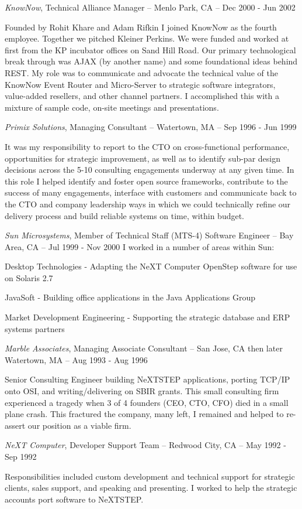 \documentclass[letterpaper]{article}
\renewenvironment{itemize}{
  \begin{list}{}{
    \setlength{\leftmargin}{1.5em}
  }
}{
  \end{list}
}
\begin{document}
\begin{itemize}
\item {\it KnowNow}, Technical Alliance Manager -- Menlo Park, CA -- Dec 2000 - Jun 2002

Founded by Rohit Khare and Adam Rifkin I joined KnowNow as the fourth
employee. Together we pitched Kleiner Perkins. We were funded and worked at
first from the KP incubator offices on Sand Hill Road. Our primary
technological break through was AJAX (by another name) and some foundational
ideas behind REST. My role was to communicate and advocate the technical value
of the KnowNow Event Router and Micro-Server to strategic software integrators,
value-added resellers, and other channel partners. I accomplished this with a
mixture of sample code, on-site meetings and presentations.

\item {\it Primix Solutions}, Managing Consultant -- Watertown, MA -- Sep 1996 - Jun 1999

It was my responsibility to report to the CTO on cross-functional performance,
opportunities for strategic improvement, as well as to identify sub-par design
decisions across the 5-10 consulting engagements underway at any given time. In
this role I helped identify and foster open source frameworks, contribute to
the success of many engagements, interface with customers and communicate back
to the CTO and company leadership ways in which we could technically refine our
delivery process and build reliable systems on time, within budget.

\item {\it Sun Microsystems}, Member of Technical Staff (MTS-4) Software Engineer -- Bay Area, CA -- Jul 1999 - Nov 2000
I worked in a number of areas within Sun:
\begin{itemize}
\item Desktop Technologies - Adapting the NeXT Computer OpenStep software for use on Solaris 2.7
\item JavaSoft - Building office applications in the Java Applications Group
\item Market Development Engineering - Supporting the strategic database and ERP systems partners
\end{itemize}

\item {\it Marble Associates}, Managing Associate Consultant -- San Jose, CA then later Watertown, MA -- Aug 1993 - Aug 1996

Senior Consulting Engineer building NeXTSTEP applications, porting TCP/IP onto
OSI, and writing/delivering on SBIR grants. This small consulting firm
experienced a tragedy when 3 of 4 founders (CEO, CTO, CFO) died in a small
plane crash. This fractured the company, many left, I remained and helped to
re-assert our position as a viable firm.

\item {\it NeXT Computer}, Developer Support Team -- Redwood City, CA -- May 1992 - Sep 1992

Responsibilities included custom development and technical support for
strategic clients, sales support, and speaking and presenting. I worked to help
the strategic accounts port software to NeXTSTEP.
\end{itemize}
\end{document}
